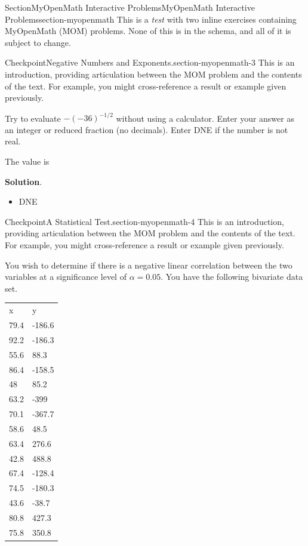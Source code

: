 \documentclass[twoside,10pt,]{article}
\newcommand{\blocktitlefont}{\relax}
\newcommand{\tabularfont}{\relax}
\numberwithin{equation}{section}
\begin{document}
\typeout{************************************************}
%
\begin{sectionptx}{Section}{MyOpenMath Interactive Problems}{}{MyOpenMath Interactive Problems}{}{}{section-myopenmath}
This is a \emph{test} with two inline exercises containing MyOpenMath (MOM) problems.  None of this is in the schema, and all of it is subject to change.%
\begin{inlineexercise}{Checkpoint}{Negative Numbers and Exponents.}{section-myopenmath-3}%
This is an introduction, providing articulation between the MOM problem and the contents of the text.  For example, you might cross-reference a result or example given previously.%
\par
Try to evaluate \(\displaystyle-{\left(-{36}\right)}^{{-{1}{/}{2}}}\) without using a calculator. Enter your answer as an integer or reduced fraction (no decimals). Enter DNE if the number is not real.%
\par
The value is   %
\par\smallskip%
\noindent\textbf{\blocktitlefont Solution}.\hypertarget{section-myopenmath-3-3}{}\quad{}%
\begin{itemize}[label=\textbullet]
\item{}DNE%
\end{itemize}
%
\end{inlineexercise}%
\begin{inlineexercise}{Checkpoint}{A Statistical Test.}{section-myopenmath-4}%
This is an introduction, providing articulation between the MOM problem and the contents of the text.  For example, you might cross-reference a result or example given previously.%
\par
You wish to determine if there is a negative linear correlation between the two variables at a significance level of \(\displaystyle\alpha={0.05}\). You have the following bivariate data set.%
\begin{center}%
{\tabularfont%
\begin{tabular}{ll}
x&y\tabularnewline[0pt]
79.4&-186.6\tabularnewline[0pt]
92.2&-186.3\tabularnewline[0pt]
55.6&88.3\tabularnewline[0pt]
86.4&-158.5\tabularnewline[0pt]
48&85.2\tabularnewline[0pt]
63.2&-399\tabularnewline[0pt]
70.1&-367.7\tabularnewline[0pt]
58.6&48.5\tabularnewline[0pt]
63.4&276.6\tabularnewline[0pt]
42.8&488.8\tabularnewline[0pt]
67.4&-128.4\tabularnewline[0pt]
74.5&-180.3\tabularnewline[0pt]
43.6&-38.7\tabularnewline[0pt]
80.8&427.3\tabularnewline[0pt]
75.8&350.8\tabularnewline[0pt]

\end{tabular}}
\end{center}
\end{inlineexercise}
\end{sectionptx}
\end{document}
